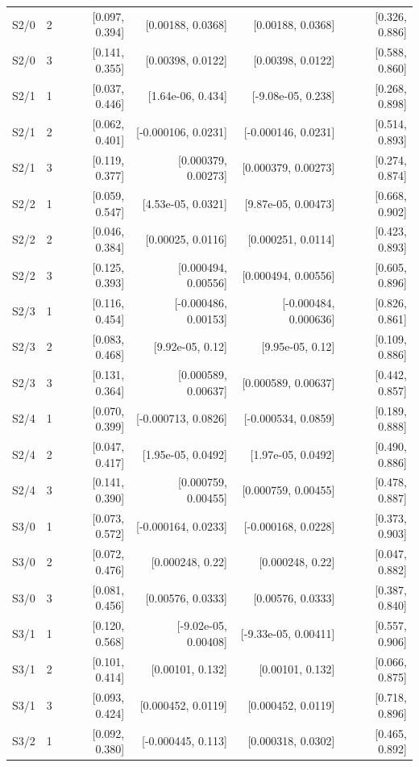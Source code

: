 \begin{longtable}{llrrrr}
S2/0 & 2 & [0.097, 0.394] & [0.00188, 0.0368] & [0.00188, 0.0368] & [0.326, 0.886] \\
S2/0 & 3 & [0.141, 0.355] & [0.00398, 0.0122] & [0.00398, 0.0122] & [0.588, 0.860] \\
S2/1 & 1 & [0.037, 0.446] & [1.64e-06, 0.434] & [-9.08e-05, 0.238] & [0.268, 0.898] \\
S2/1 & 2 & [0.062, 0.401] & [-0.000106, 0.0231] & [-0.000146, 0.0231] & [0.514, 0.893] \\
S2/1 & 3 & [0.119, 0.377] & [0.000379, 0.00273] & [0.000379, 0.00273] & [0.274, 0.874] \\
S2/2 & 1 & [0.059, 0.547] & [4.53e-05, 0.0321] & [9.87e-05, 0.00473] & [0.668, 0.902] \\
S2/2 & 2 & [0.046, 0.384] & [0.00025, 0.0116] & [0.000251, 0.0114] & [0.423, 0.893] \\
S2/2 & 3 & [0.125, 0.393] & [0.000494, 0.00556] & [0.000494, 0.00556] & [0.605, 0.896] \\
S2/3 & 1 & [0.116, 0.454] & [-0.000486, 0.00153] & [-0.000484, 0.000636] & [0.826, 0.861] \\
S2/3 & 2 & [0.083, 0.468] & [9.92e-05, 0.12] & [9.95e-05, 0.12] & [0.109, 0.886] \\
S2/3 & 3 & [0.131, 0.364] & [0.000589, 0.00637] & [0.000589, 0.00637] & [0.442, 0.857] \\
S2/4 & 1 & [0.070, 0.399] & [-0.000713, 0.0826] & [-0.000534, 0.0859] & [0.189, 0.888] \\
S2/4 & 2 & [0.047, 0.417] & [1.95e-05, 0.0492] & [1.97e-05, 0.0492] & [0.490, 0.886] \\
S2/4 & 3 & [0.141, 0.390] & [0.000759, 0.00455] & [0.000759, 0.00455] & [0.478, 0.887] \\
S3/0 & 1 & [0.073, 0.572] & [-0.000164, 0.0233] & [-0.000168, 0.0228] & [0.373, 0.903] \\
S3/0 & 2 & [0.072, 0.476] & [0.000248, 0.22] & [0.000248, 0.22] & [0.047, 0.882] \\
S3/0 & 3 & [0.081, 0.456] & [0.00576, 0.0333] & [0.00576, 0.0333] & [0.387, 0.840] \\
S3/1 & 1 & [0.120, 0.568] & [-9.02e-05, 0.00408] & [-9.33e-05, 0.00411] & [0.557, 0.906] \\
S3/1 & 2 & [0.101, 0.414] & [0.00101, 0.132] & [0.00101, 0.132] & [0.066, 0.875] \\
S3/1 & 3 & [0.093, 0.424] & [0.000452, 0.0119] & [0.000452, 0.0119] & [0.718, 0.896] \\
S3/2 & 1 & [0.092, 0.380] & [-0.000445, 0.113] & [0.000318, 0.0302] & [0.465, 0.892] \\

\end{longtable}
